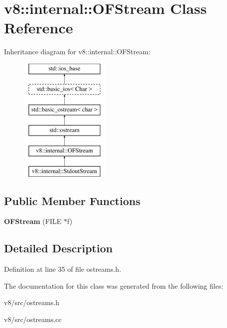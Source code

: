 \hypertarget{classv8_1_1internal_1_1OFStream}{}\section{v8\+:\+:internal\+:\+:O\+F\+Stream Class Reference}
\label{classv8_1_1internal_1_1OFStream}
Inheritance diagram for v8\+:\+:internal\+:\+:O\+F\+Stream\+:\begin{figure}[H]
\begin{center}
\leavevmode
\includegraphics[height=6.000000cm]{classv8_1_1internal_1_1OFStream}
\end{center}
\end{figure}
\subsection*{Public Member Functions}
\begin{DoxyCompactItemize}
\item 
\mbox{\label{classv8_1_1internal_1_1OFStream_ab570d7dfbde721ff8f96c9a7ae8f9c5f}} 
{\bfseries O\+F\+Stream} (F\+I\+LE $\ast$f)
\end{DoxyCompactItemize}


\subsection{Detailed Description}


Definition at line 35 of file ostreams.\+h.



The documentation for this class was generated from the following files\+:\begin{DoxyCompactItemize}
\item 
v8/src/ostreams.\+h\item 
v8/src/ostreams.\+cc\end{DoxyCompactItemize}
